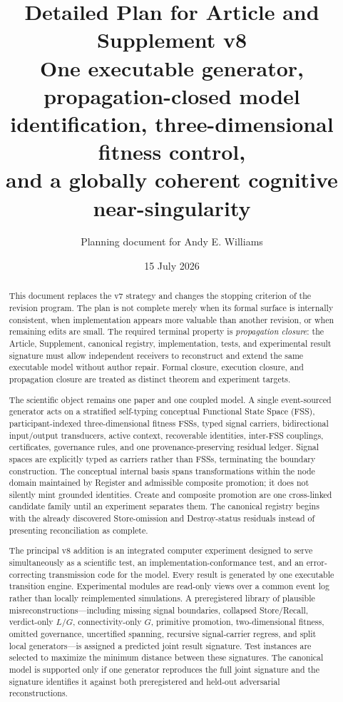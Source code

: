 \documentclass[11pt]{article}
\title{\textbf{Detailed Plan for Article and Supplement v8}\\
\large One executable generator, propagation-closed model identification, three-dimensional fitness control,\\
and a globally coherent cognitive near-singularity}
\author{Planning document for Andy E. Williams}
\date{15 July 2026}
\begin{document}
\maketitle
\begin{abstract}
This document replaces the v7 strategy and changes the stopping criterion of the revision program. The plan is not complete merely when its formal surface is internally consistent, when implementation appears more valuable than another revision, or when remaining edits are small. The required terminal property is \emph{propagation closure}: the Article, Supplement, canonical registry, implementation, tests, and experimental result signature must allow independent receivers to reconstruct and extend the same executable model without author repair. Formal closure, execution closure, and propagation closure are treated as distinct theorem and experiment targets.

The scientific object remains one paper and one coupled model. A single event-sourced generator acts on a stratified self-typing conceptual Functional State Space (FSS), participant-indexed three-dimensional fitness FSSs, typed signal carriers, bidirectional input/output transducers, active context, recoverable identities, inter-FSS couplings, certificates, governance rules, and one provenance-preserving residual ledger. Signal spaces are explicitly typed as carriers rather than FSSs, terminating the boundary construction. The conceptual internal basis spans transformations within the node domain maintained by Register and admissible composite promotion; it does not silently mint grounded identities. Create and composite promotion are one cross-linked candidate family until an experiment separates them. The canonical registry begins with the already discovered Store-omission and Destroy-status residuals instead of presenting reconciliation as complete.

The principal v8 addition is an integrated computer experiment designed to serve simultaneously as a scientific test, an implementation-conformance test, and an error-correcting transmission code for the model. Every result is generated by one executable transition engine. Experimental modules are read-only views over a common event log rather than locally reimplemented simulations. A preregistered library of plausible misreconstructions---including missing signal boundaries, collapsed Store/Recall, verdict-only $L/G$, connectivity-only $G$, primitive promotion, two-dimensional fitness, omitted governance, uncertified spanning, recursive signal-carrier regress, and split local generators---is assigned a predicted joint result signature. Test instances are selected to maximize the minimum distance between these signatures. The canonical model is supported only if one generator reproduces the full joint signature and the signature identifies it against both preregistered and held-out adversarial reconstructions.


\end{abstract}
\end{document}
